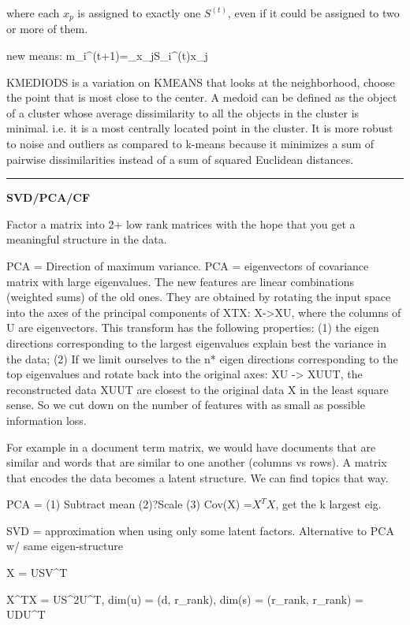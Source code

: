 \documentclass[a4paper,twoside,twocolumn]{article}
\begin{document}
{{where each $x_{p}$ is assigned to exactly one $S^{(t)}$, even if it could be assigned to two or more of them.

new means: m_{i}^{(t+1)}={}\sum _{x_{j}\in S_{i}^{(t)}}x_{j}

KMEDIODS is a variation on KMEANS that looks at the neighborhood, choose the point that is most close to the center. A medoid can be defined as the object of a cluster whose average dissimilarity to all the objects in the cluster is minimal. i.e. it is a most centrally located point in the cluster. It is more robust to noise and outliers as compared to k-means because it minimizes a sum of pairwise dissimilarities instead of a sum of squared Euclidean distances.
\noindent\rule{8cm}{0.4pt}

}



\textbf{SVD/PCA/CF}

\setlength{\parindent}{0pt}
{\scriptsize
Factor a matrix into 2+ low rank matrices with the hope that you get a meaningful structure in the data.

PCA = Direction of maximum variance. PCA = eigenvectors of covariance matrix with large eigenvalues. The new features are linear combinations (weighted sums) of the old ones. They are obtained by rotating the input space into the axes of the principal components of XTX: X->XU, where the columns of U are eigenvectors. This transform has the following properties: (1) the eigen directions corresponding to the largest eigenvalues explain best the variance in the data; (2) If we limit ourselves to the n* eigen directions corresponding to the top eigenvalues and rotate back into the original axes: XU -> XUUT, the reconstructed data XUUT are closest to the original data X in the least square sense. So we cut down on the number of features with as small as possible information loss.

For example in a document term matrix, we would have documents that are similar and words that are similar to one another (columns vs rows). A matrix that encodes the data becomes a latent structure. We can find topics that way.

PCA = (1) Subtract mean (2)?Scale (3) Cov(X) =$X^TX$, get the k largest eig.

SVD = approximation when using only some latent factors. Alternative to PCA w/ same eigen-structure

X = USV^T

X^TX = US^2U^T, dim(u) = (d, r_rank), dim(s) = (r_rank, r_rank) = UDU^T

}}
\end{document}
